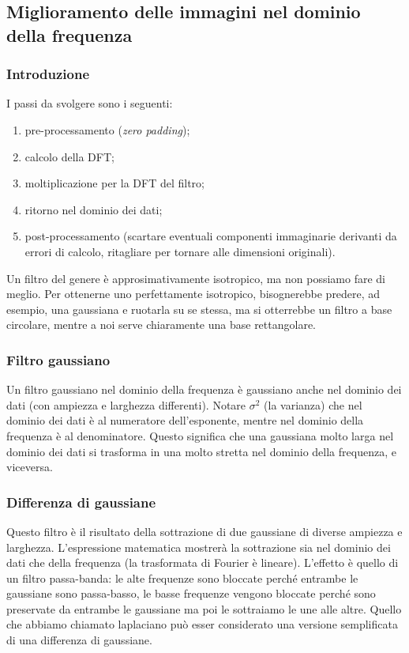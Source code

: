 \documentclass[a4paper,11pt]{article}
\begin{document}
\subsection{Miglioramento delle immagini nel dominio della frequenza}
\subsubsection{Introduzione}
I passi da svolgere sono i seguenti:
\begin{enumerate}
    \item pre-processamento (\textit{zero padding});
    \item calcolo della DFT;
    \item moltiplicazione per la DFT del filtro;
    \item ritorno nel dominio dei dati;
    \item post-processamento (scartare eventuali componenti immaginarie derivanti da errori di calcolo, ritagliare per tornare alle dimensioni
    originali).
\end{enumerate}
\par
Un filtro del genere è approsimativamente isotropico, ma non possiamo fare di meglio. Per ottenerne uno perfettamente isotropico,
bisognerebbe predere, ad esempio, una gaussiana e ruotarla su se stessa, ma si otterrebbe un filtro a base circolare, mentre a noi serve chiaramente
una base rettangolare.

\subsubsection{Filtro gaussiano}
Un filtro gaussiano nel dominio della frequenza è gaussiano anche nel dominio dei dati (con ampiezza e larghezza differenti).
Notare $\sigma^2$ (la varianza) che nel dominio dei dati è al numeratore dell'esponente, mentre nel dominio della frequenza
è al denominatore. Questo significa che una gaussiana molto larga nel dominio dei dati si trasforma in una molto stretta nel dominio della frequenza,
e viceversa.

\subsubsection{Differenza di gaussiane}
Questo filtro è il risultato della sottrazione di due gaussiane di diverse ampiezza e larghezza. L'espressione matematica
mostrerà la sottrazione sia nel dominio dei dati che della frequenza (la trasformata di Fourier è lineare).
L'effetto è quello di un filtro passa-banda: le alte frequenze sono bloccate perché entrambe le gaussiane sono passa-basso, le basse frequenze
vengono bloccate perché sono preservate da entrambe le gaussiane ma poi le sottraiamo le une alle altre.
Quello che abbiamo chiamato laplaciano può esser considerato una versione semplificata di una differenza di gaussiane.
\end{document}
